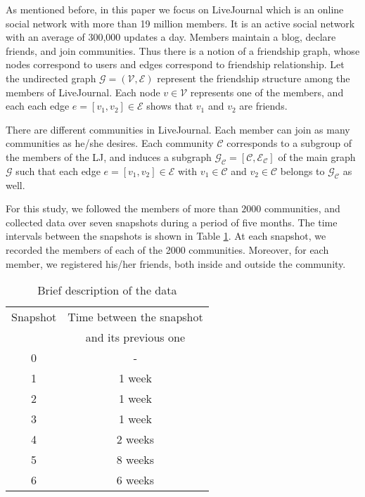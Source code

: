 As mentioned before, in this paper we focus on LiveJournal which is an  online social network with more than 19 million members.  It is an active social network with an average of 300,000 updates a day. 
Members maintain a blog, declare friends, and join communities. Thus there is a notion of a friendship graph, whose nodes correspond to users and edges correspond to friendship relationship. Let the undirected graph $\mathcal{G}=(\mathcal{V},\mathcal{E})$ represent the friendship structure among the members of LiveJournal. Each node $v\in\mathcal{V}$ represents one of the members, and each each edge $e=[v_1,v_2]\in\mathcal{E}$ shows that $v_1$ and $v_2$ are friends. 

There are different communities in LiveJournal. Each member can join as many communities as he/she desires. Each community $\mathcal{C}$ corresponds to a subgroup of the members of the LJ, and induces a subgraph $\mathcal{G}_{\mathcal{C}}=[\mathcal{C},\mathcal{E}_{\mathcal{C}}]$ of the main graph $\mathcal{G}$ such that  each edge $e=[v_1,v_2]\in\mathcal{E}$ with $v_1\in\mathcal{C}$ and  $v_2\in\mathcal{C}$ belongs to $\mathcal{G}_{\mathcal{C}}$ as well.

For this study, we followed the members of more than $2000$ communities, and  collected data over seven snapshots during a period of five months.  The time intervals between the snapshots is shown in Table \ref{tb:data}. At each snapshot, we recorded the  members of each of the 2000 communities. Moreover, for each  member, we registered his/her friends, both inside and outside the community. 

\begin{table}[htdp]
\begin{center}
\begin{tabular}{|c|c|}
\hline
Snapshot  & Time between the snapshot  \\
  & and its previous one \\ \hline
0 & -  \\ \hline
1 & 1 week \\ \hline
2 & 1 week \\ \hline
3 & 1 week \\ \hline
4 & 2 weeks \\ \hline
5 & 8 weeks \\ \hline
6 & 6 weeks \\ \hline
\end{tabular}
\end{center}\caption{Brief description of the data}
\label{tb:data}
\end{table}%

